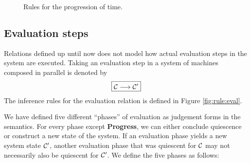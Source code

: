 \begin{figure}[!ht]
\caption{Rules for the progression of time.}\label{fig:rule:progress}
\end{figure}

\subsection{Evaluation steps}

Relations defined up until now does not model how actual evaluation steps in the
system are executed. Taking an evaluation step in a system of machines composed
in parallel is denoted by
\begin{equation*}
\boxed{\mathcal{C} \longrightarrow \mathcal{C}'}
\end{equation*}
The inference rules for the evaluation relation is defined in Figure
\ref{fig:rule:eval}.

We have defined five different ``phases'' of evaluation as judgement forms in
the semantics. For every phase except \textbf{Progress}, we can either conclude
quiescence or construct a new state of the system. If an evaluation phase yields
a new system state $\mathcal{C}'$, another evaluation phase that was quiescent for $\mathcal{C}$
may not necessarily also be quiescent for $\mathcal{C}'$. We define the five phases as
follows:

